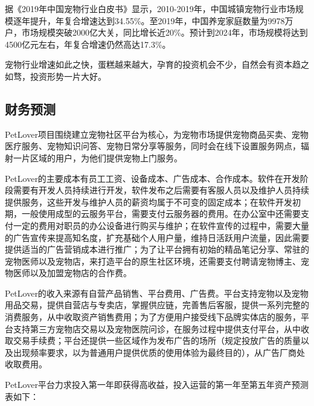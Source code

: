 \documentclass[a4paper]{ctexart}
\begin{document}
  据《2019年中国宠物行业白皮书》显示，2010-2019年，中国城镇宠物行业市场规模逐年提升，年复合增速达到34.55\%。至2019年，中国养宠家庭数量为9978万户，市场规模突破2000亿大关，同比增长近20\%。预计到2024年，市场规模将达到4500亿元左右，年复合增速仍然高达17.3\%。

  宠物行业增速如此之快，蛋糕越来越大，孕育的投资机会不少，自然会有资本趋之如骛，投资形势一片大好。

\subsection{财务预测}

PetLover项目围绕建立宠物社区平台为核心，为宠物市场提供宠物商品买卖、宠物医疗服务、宠物知识问答、宠物日常分享等服务，同时会在线下设置服务网点，辐射一片区域的用户，为他们提供宠物上门服务。

PetLover的主要成本有员工工资、设备成本、广告成本、合作成本。软件在开发阶段需要有开发人员持续进行开发，软件发布之后需要有客服人员以及维护人员持续提供服务，这些开发与维护人员的薪资均属于不可变的固定成本；在软件开发初期，一般使用成型的云服务平台，需要支付云服务器的费用。在办公室中还需要支付一定的费用对职员的办公设备进行购买与维护；在软件宣传的过程中，需要大量的广告宣传来提高知名度，扩充基础个人用户量，维持日活跃用户流量，因此需要提供适当的广告营销成本进行推广；为了让平台拥有初始的精品笔记分享、常驻的宠物医师以及宠物店，来打造平台的原生社区环境，还需要支付聘请宠物博主、宠物医师以及加盟宠物店的合作费。

PetLover的收入来源有自营产品销售、平台费用、广告费。平台支持宠物以及宠物用品交易，提供自营店与专卖店，掌握供应链，完善售后客服，提供一系列完整的消费服务，从中收取资产销售费用；为了方便用户接受线下品牌实体店的服务，平台支持第三方宠物店交易以及宠物医院问诊，在服务过程中提供支付平台，从中收取交易手续费；平台还提供一些区域作为发布广告的场所（规定投放广告的质量以及出现频率要求，以为普通用户提供优质的使用体验为最终目的），从广告厂商处收取费用。

PetLover平台力求投入第一年即获得高收益，投入运营的第一年至第五年资产预测表如下：
\end{document}
